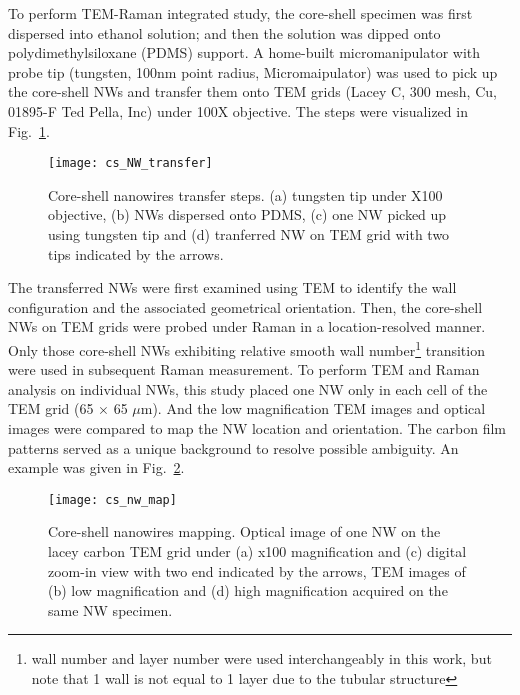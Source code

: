 To perform TEM-Raman integrated study, the core-shell specimen was first dispersed into ethanol solution; and then the solution was dipped onto polydimethylsiloxane (PDMS) support. A home-built micromanipulator with probe tip (tungsten, 100nm point radius, Micromaipulator) was used to pick up the core-shell NWs and transfer them onto TEM grids (Lacey C, 300 mesh, Cu, 01895-F Ted Pella, Inc) under 100X objective. The steps were visualized in Fig.~\ref{fig:ch5ws2trans}. 
\begin{figure}[htb]
\centering
\texttt{[image: cs\_NW\_transfer]}
\caption[Core-shell nanowires transfer steps]{Core-shell nanowires transfer steps. (a) tungsten tip under X100 objective, (b) NWs dispersed onto PDMS, (c) one NW picked up using tungsten tip and (d) tranferred NW on TEM grid with two tips indicated by the arrows.}
\label{fig:ch5ws2trans}
\end{figure}
The transferred NWs were first examined using TEM to identify the  wall configuration and the associated geometrical orientation. Then, the core-shell NWs on TEM grids were probed under Raman in a location-resolved manner. Only those core-shell NWs exhibiting relative smooth  wall number\footnote{wall number and layer number were used interchangeably in this work, but note that 1 wall is not equal to 1 layer due to the tubular structure} transition were used in subsequent Raman measurement. To perform TEM and Raman analysis on individual NWs, this study placed one NW only in each cell of the TEM grid (65 $\times$ 65 $\mu$m). And the low magnification TEM images and optical images were compared to map the NW location and orientation. The carbon film patterns served as a unique background to resolve possible ambiguity. An example was given in Fig.~\ref{fig:ch5ws2map}. 
\begin{figure}[htb]
\centering
\texttt{[image: cs\_nw\_map]}
\caption[Core-shell nanowires mapping]{Core-shell nanowires mapping. Optical image of one NW on the lacey  carbon TEM grid under (a) x100 magnification and (c) digital zoom-in view with two end indicated by the arrows, TEM images of (b) low magnification and (d) high magnification acquired on the same NW specimen.}
\label{fig:ch5ws2map}
\end{figure}

